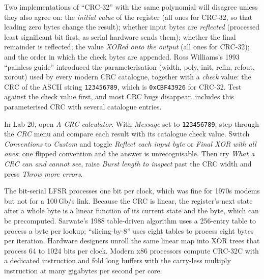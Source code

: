 \begin{pitfall}
Two implementations of ``CRC-32'' with the same polynomial will disagree unless they also agree
on: the \emph{initial value} of the register (all ones for CRC-32, so that leading zero bytes
change the result); whether input bytes are \emph{reflected} (processed least significant bit
first, as serial hardware sends them); whether the final remainder is reflected; the value
\emph{XORed onto the output} (all ones for CRC-32); and the order in which the check bytes are
appended. Ross Williams's 1993 ``painless guide'' introduced the parameterisation (width, poly,
init, refin, refout, xorout) used by every modern CRC catalogue, together with a \emph{check}
value: the CRC of the ASCII string \texttt{123456789}, which is \texttt{0xCBF43926} for CRC-32. Test
against the check value first, and most CRC bugs disappear.  includes this
parameterised CRC with several catalogue entries.
\end{pitfall}


\begin{tryit}
In Lab 20, open \emph{A CRC calculator}. With \emph{Message} set to \texttt{123456789}, step through
the \emph{CRC} menu and compare each result with its catalogue check value. Switch
\emph{Conventions} to \emph{Custom} and toggle \emph{Reflect each input byte} or \emph{Final XOR
with all ones}: one flipped convention and the answer is unrecognisable. Then try \emph{What a CRC
can and cannot see}, raise \emph{Burst length to inspect} past the CRC width and press \emph{Throw
more errors}.
\end{tryit}

\begin{inpractice}
The bit-serial LFSR processes one bit per clock, which was fine for 1970s modems but not for a
100\,Gb/s link. Because the CRC is linear, the register's next state after a whole byte is a
linear function of its current state and the byte, which can be precomputed. Sarwate's 1988
table-driven algorithm uses a 256-entry table to process a byte per lookup; ``slicing-by-8''
uses eight tables to process eight bytes per iteration. Hardware designers unroll the same
linear map into XOR trees that process 64 to 1024 bits per clock. Modern x86 processors compute
CRC-32C with a dedicated instruction and fold long buffers with the carry-less multiply
instruction at many gigabytes per second per core.
\end{inpractice}


